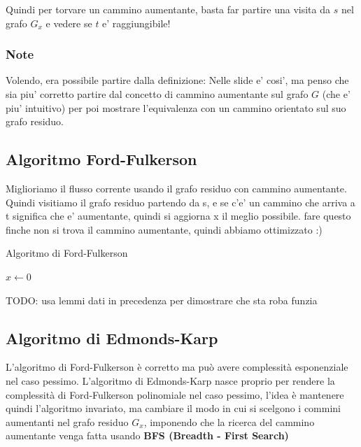 Quindi per torvare un cammino aumentante, basta far partire una visita da $ s  $ nel grafo $ G_x $ e vedere se $ t $ e' raggiungibile!

\subsubsection{Note}
Volendo, era possibile partire dalla definizione:
Nelle slide e' cosi', ma penso che sia piu' corretto partire dal concetto di cammino aumentante sul grafo $ G $ (che e' piu' intuitivo) per poi mostrare l'equivalenza con un cammino orientato sul suo grafo residuo.


\subsection{Algoritmo Ford-Fulkerson}

Miglioriamo il flusso corrente usando il grafo residuo con cammino aumentante. Quindi visitiamo il grafo residuo partendo da s, e se c'e' un cammino che arriva a t significa che e' aumentante, quindi si aggiorna x il meglio possibile. fare questo finche non si trova il cammino aumentante, quindi abbiamo ottimizzato :)

\begin{algorithm}
  \caption{Algoritmo di Ford-Fulkerson}

  $x \gets 0$\;

\end{algorithm}

TODO: usa lemmi dati in precedenza per dimostrare che sta roba funzia

\subsection{Algoritmo di Edmonds-Karp}
L'algoritmo di Ford-Fulkerson è corretto ma può avere complessità esponenziale nel caso pessimo. L'algoritmo di Edmonds-Karp nasce proprio per rendere la complessità di Ford-Fulkerson polinomiale nel caso pessimo, l'idea è mantenere quindi l'algoritmo invariato, ma cambiare il modo in cui si scelgono i commini aumentanti nel grafo residuo $G_x$, imponendo che la ricerca del cammino aumentante venga fatta usando \textbf{BFS (Breadth - First Search)}

